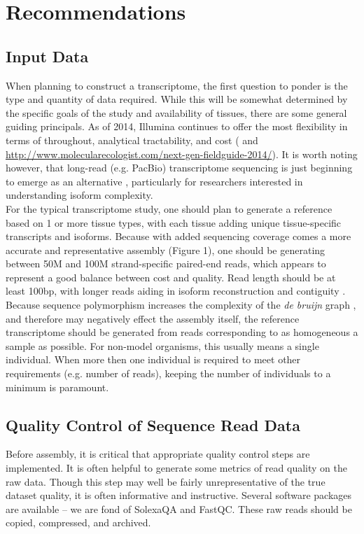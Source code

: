 \section*{Recommendations}

\subsection{Input Data}
When planning to construct a transcriptome, the first question to ponder is the type and quantity of data required. While this will be somewhat determined by the specific goals of the study and availability of tissues, there are some general guiding principals. As of 2014, Illumina continues to offer the most flexibility in terms of throughout, analytical tractability, and cost (\citep{Glenn:2011gy} and \url{http://www.molecularecologist.com/next-gen-fieldguide-2014/}). It is worth noting however, that long-read (e.g. PacBio) transcriptome sequencing is just beginning to emerge as an alternative \citep{Au:2013hp}, particularly for researchers interested in understanding isoform complexity. \\

For the typical transcriptome study, one should plan to generate a reference based on 1 or more tissue types, with each tissue adding unique tissue-specific transcripts and isoforms. Because with added sequencing coverage comes a more accurate and representative assembly (Figure 1), one should be generating between 50M and 100M strand-specific paired-end reads, which appears to represent a good balance between cost and quality. Read length should be at least 100bp, with longer reads aiding in isoform reconstruction and contiguity \citep{Garber:2011gp}. Because sequence polymorphism increases the complexity of the \textit{de bruijn} graph \citep{Iqbal:2012fx,Paszkiewicz:2010dla}, and therefore may negatively effect the assembly itself, the reference transcriptome should be generated from reads corresponding to as homogeneous a sample as possible. For non-model organisms, this usually means a single individual. When more then one individual is required to meet other requirements (e.g. number of reads), keeping the number of individuals to a minimum is paramount. \\

\subsection{Quality Control of Sequence Read Data}
Before assembly, it is critical that appropriate quality control steps are implemented. It is often helpful to generate some metrics of read quality on the raw data. Though this step may well be fairly unrepresentative of the true dataset quality, it is often informative and instructive. Several software packages are available -- we are fond of SolexaQA and FastQC. These raw reads should be copied, compressed, and archived. \\

